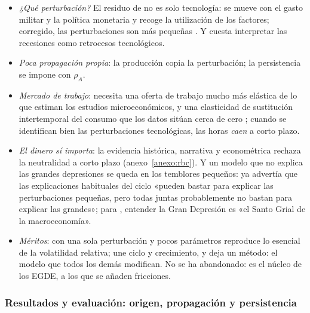 \documentclass[11pt]{article}
\begin{document}
\begin{itemize}
\item \emph{¿Qué perturbación?} El residuo de  no es solo tecnología: se mueve con el gasto militar y la política monetaria\nocite{Hall1988} y recoge la utilización de los factores; corregido, las perturbaciones son más pequeñas\nocite{BurnsideEichenbaumRebelo1993Labor} . Y cuesta interpretar las recesiones como retrocesos tecnológicos.
\item \emph{Poca propagación propia}: la producción copia la perturbación; la persistencia se impone con $\rho_A$\nocite{CogleyNason1995Output,RotembergWoodford1996Real}.
\item \emph{Mercado de trabajo}: necesita una oferta de trabajo mucho más elástica de lo que estiman los estudios microeconómicos, y una elasticidad de sustitución intertemporal del consumo que los datos sitúan cerca de cero\nocite{Hall1988Intertemporal} ; cuando se identifican bien las perturbaciones tecnológicas, las horas \emph{caen} a corto plazo\nocite{Gali1999Technology}.
\item \emph{El dinero sí importa}: la evidencia histórica, narrativa y econométrica rechaza la neutralidad a corto plazo (anexo~\ref{anexo:rbc}). Y un modelo que no explica las grandes depresiones se queda en los temblores pequeños: ya \textcite{Fisher1933} advertía que las explicaciones habituales del ciclo «pueden bastar para explicar las perturbaciones pequeñas, pero todas juntas probablemente no bastan para explicar las grandes»; para \textcite{Bernanke1995Macroeconomics}, entender la Gran Depresión es «el Santo Grial de la macroeconomía».
\item \emph{Méritos}: con una sola perturbación y pocos parámetros reproduce lo esencial de la volatilidad relativa; une ciclo y crecimiento, y deja un método: el modelo que todos los demás modifican\nocite{Rebelo2005Real}. No se ha abandonado: es el núcleo de los EGDE, a los que se añaden fricciones.
\end{itemize}

\subsubsection{Resultados y evaluación: origen, propagación y persistencia}\label{sec:rbc-resultados}
\end{document}
